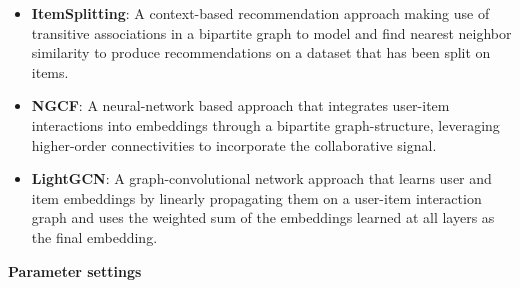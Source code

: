 \begin{itemize}
    \item \textbf{ItemSplitting\cite{GraphBasedCollaborativePaper}}: A context-based recommendation approach making use of transitive associations in a bipartite graph to model and find nearest neighbor similarity to produce recommendations on a dataset that has been split on items.
    \item \textbf{NGCF\cite{NGCF}}: A neural-network based approach that integrates user-item interactions into embeddings through a bipartite graph-structure, leveraging higher-order connectivities to incorporate the collaborative signal.
    \item \textbf{LightGCN\cite{LightGCN}}: A graph-convolutional network approach that learns user and item embeddings by linearly propagating them on a user-item interaction graph and uses the weighted sum of the embeddings learned at all layers as the final embedding.
\end{itemize}
\textbf{Parameter settings}\\
